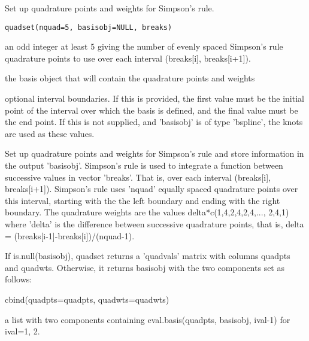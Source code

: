 \begin{Description}\relax
Set up quadrature points and weights for Simpson's rule.
\end{Description}
\begin{Usage}
\begin{verbatim}
quadset(nquad=5, basisobj=NULL, breaks) 
\end{verbatim}
\end{Usage}
\begin{Arguments}
\begin{ldescription}
\item[\code{nquad}] an odd integer at least 5 giving the number of evenly spaced
Simpson's rule quadrature points to use over each interval
(breaks[i], breaks[i+1]). 

\item[\code{basisobj}] the basis object that will contain the quadrature points and weights

\item[\code{breaks}] optional interval boundaries.  If this is provided, the first value
must be the initial point of the interval over which the basis is
defined, and the final value must be the end point.  If this is not
supplied, and 'basisobj' is of type 'bspline', the knots are used as
these values.

\end{ldescription}
\end{Arguments}
\begin{Details}\relax
Set up quadrature points and weights for Simpson's rule and store
information in the output 'basisobj'.  Simpson's rule is used to
integrate a function between successive values in vector 'breaks'.
That is, over each interval (breaks[i], breaks[i+1]).  Simpson's rule
uses 'nquad' equally spaced quadrature points over this interval,
starting with the the left boundary and ending with the right
boundary.  The quadrature weights are the values
delta*c(1,4,2,4,2,4,..., 2,4,1) where 'delta' is the difference
between successive quadrature points, that is, delta =
(breaks[i-1]-breaks[i])/(nquad-1).
\end{Details}
\begin{Value}
If is.null(basisobj), quadset returns a 'quadvals' matrix with columns
quadpts and quadwts.  Otherwise, it returns basisobj with the
two components set as follows:   

\begin{ldescription}
\item[\code{quadvals}] cbind(quadpts=quadpts, quadwts=quadwts)    

\item[\code{value}] a list with two components containing eval.basis(quadpts, basisobj,
ival-1) for ival=1, 2.  

\end{ldescription}
\end{Value}

